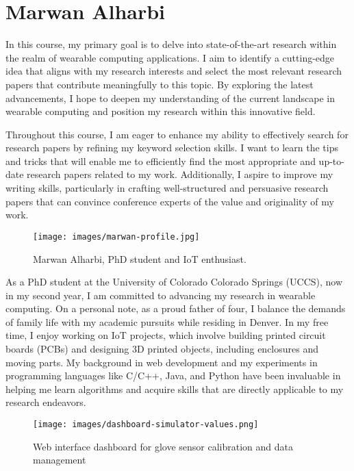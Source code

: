 \section{Marwan Alharbi}

In this course, my primary goal is to delve into state-of-the-art research within the realm of wearable computing applications. I aim to identify a cutting-edge idea that aligns with my research interests and select the most relevant research papers that contribute meaningfully to this topic. By exploring the latest advancements, I hope to deepen my understanding of the current landscape in wearable computing and position my research within this innovative field.

Throughout this course, I am eager to enhance my ability to effectively search for research papers by refining my keyword selection skills. I want to learn the tips and tricks that will enable me to efficiently find the most appropriate and up-to-date research papers related to my work. Additionally, I aspire to improve my writing skills, particularly in crafting well-structured and persuasive research papers that can convince conference experts of the value and originality of my work.

\begin{figure}[h]
  \centering
  \texttt{[image: images/marwan-profile.jpg]}
  \caption{Marwan Alharbi, PhD student and IoT enthusiast.}
  \label{fig:marwan:profile}
\end{figure}

As a PhD student at the University of Colorado Colorado Springs (UCCS), now 
in my second year, I am committed to advancing my research in wearable 
computing. On a personal note, as a proud father of four, I balance the 
demands of family life with my academic pursuits while residing in Denver. 
In my free time, I enjoy working on IoT projects, which involve building 
printed circuit boards (PCBs) and designing 3D printed objects, including 
enclosures and moving parts. My background in web development and my 
experiments in programming languages like C/C++, Java, and Python have been 
invaluable in helping me learn algorithms and acquire skills that are 
directly applicable to my research endeavors.



\begin{figure}[h]
  \centering
  \texttt{[image: images/dashboard-simulator-values.png]}
  \caption{Web interface dashboard for glove sensor calibration and data management}
  \label{fig:marwan:web}
\end{figure}

